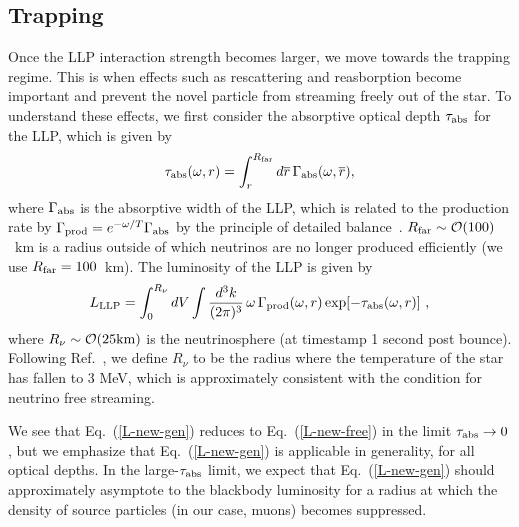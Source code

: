 \documentclass[11pt]{article}
\newcommand{\beq}{\begin{equation}} \newcommand{\eeq}{\end{equation}}
\newcommand{\Eq}[1]{Eq.~(\ref{#1})} \newcommand{\Eqs}[2]{Eqs.~(\ref{#1}) and (\ref{#2})} \newcommand{\Eqm}[2]{Eqs.~(\ref{#1}) through (\ref{#2})}
\begin{document}
\subsection{Trapping}

Once the LLP interaction strength becomes larger, we move towards the trapping regime. This is when effects such as rescattering and reasborption become important and prevent the novel particle from streaming freely out of the star. To understand these effects, we first consider the absorptive optical depth $\tau_{\rm abs}$ for the LLP, which is given by
\begin{eqnarray} \label{opt-depth}
 \tau_{\rm abs}(\omega, r) = \int_{r}^{R_{\rm far}} d \overline r \, \Gamma_{\rm abs}(\omega, \overline r),
\end{eqnarray}
where $\Gamma_{\rm abs}$ is the absorptive width of the LLP, which is related to the production rate by $\Gamma_{\rm prod}=e^{-\omega/T}\Gamma_{\rm abs}$ by the principle
of detailed balance~\cite{Weldon:1983jn}. $R_{\rm far}\sim\mathcal{O}(100)$~km is a radius outside of which neutrinos are no longer produced efficiently (we use $R_{\rm far}=100$~km). The luminosity of the LLP is given by
\beq \label{L-new-gen}
L_{\rm LLP} = \int_0^{R_\nu} dV \int \frac{d^3k}{(2\pi)^3} \, \omega \, \Gamma_{\rm prod}(\omega,r) \exp\!\bL - \tau_{\rm abs} (\omega, r) \bR \,,
\eeq
where $R_\nu\sim\mathcal{O}(25 \rm km)$ is the neutrinosphere (at timestamp 1 second post bounce). Following Ref.~\cite{Chang:2016ntp}, we define $R_\nu$ to be the radius where the temperature of the star has fallen to 3 MeV, which is approximately consistent with the condition for neutrino free streaming.

We see that \Eq{L-new-gen} reduces to \Eq{L-new-free} in the limit $\tau_{\rm abs} \to 0$, but we emphasize that \Eq{L-new-gen} is applicable in generality, for all optical depths. In the large-$\tau_{\rm abs}$ limit, we expect that \Eq{L-new-gen} should approximately asymptote to the blackbody luminosity for a radius at which the density of source particles (in our case, muons) becomes suppressed.
\end{document}

